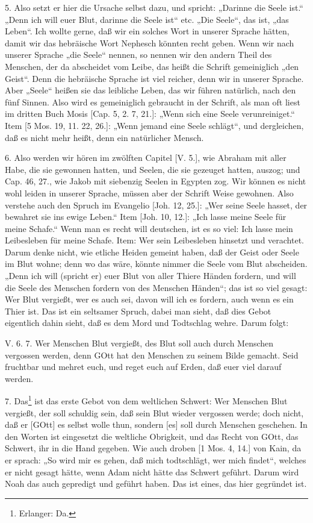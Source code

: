 5. Also setzt er hier die Ursache selbst dazu, und spricht: „Darinne die Seele ist.“ „Denn ich will euer Blut, darinne die Seele ist“ etc. „Die Seele“, das ist, „das Leben“. Ich wollte gerne, daß wir ein solches Wort in unserer Sprache hätten, damit wir das hebräische Wort Nephesch könnten recht geben. Wenn wir nach unserer Sprache „die Seele“ nennen, so nennen wir den andern Theil des Menschen, der da abscheidet vom Leibe, das heißt die Schrift gemeiniglich „den Geist“. Denn die hebräische Sprache ist viel reicher, denn wir in unserer Sprache. Aber „Seele“ heißen sie das leibliche Leben, das wir führen natürlich, nach den fünf Sinnen. Also wird es gemeiniglich gebraucht in der Schrift, als man oft liest im dritten Buch Mosis [Cap. 5, 2. 7, 21.]: „Wenn sich eine Seele verunreiniget.“ Item [5 Mos. 19, 11. 22, 26.]: „Wenn jemand eine Seele schlägt“, und dergleichen, daß es nicht mehr heißt, denn ein natürlicher Mensch.

6. Also werden wir hören im zwölften Capitel [V. 5.], wie Abraham mit aller Habe, die sie gewonnen hatten, und Seelen, die sie gezeuget hatten, auszog; und Cap. 46, 27., wie Jakob mit siebenzig Seelen in Egypten zog. Wir können es nicht wohl leiden in unserer Sprache, müssen aber der Schrift Weise gewohnen. Also verstehe auch den Spruch im Evangelio [Joh. 12, 25.]: „Wer seine Seele hasset, der bewahret sie ins ewige Leben.“ Item [Joh. 10, 12.]: „Ich lasse meine Seele für meine Schafe.“ Wenn man es recht will deutschen, ist es so viel: Ich lasse mein Leibesleben für meine Schafe. Item: Wer sein Leibesleben hinsetzt und verachtet. Darum denke nicht, wie etliche Heiden gemeint haben, daß der Geist oder Seele im Blut wohne; denn wo das wäre, könnte nimmer die Seele vom Blut abscheiden. „Denn ich will (spricht er) euer Blut von aller Thiere Händen fordern, und will die Seele des Menschen fordern von des Menschen Händen“; das ist so viel gesagt: Wer Blut vergießt, wer es auch sei, davon will ich es fordern, auch wenn es ein Thier ist. Das ist ein seltsamer Spruch, dabei man sieht, daß dies Gebot eigentlich dahin sieht, daß es dem Mord und Todtschlag wehre. Darum folgt:

\begin{schriftzitat}
V. 6. 7. Wer Menschen Blut vergießt, des Blut soll auch durch Menschen vergossen werden, denn GOtt hat den Menschen zu seinem Bilde gemacht. Seid fruchtbar und mehret euch, und reget euch auf Erden, daß euer viel darauf werden.
\end{schriftzitat}

7. Das\footnote{Erlanger: Da.} ist das erste Gebot von dem weltlichen Schwert: Wer Menschen Blut vergießt, der soll schuldig sein, daß sein Blut wieder vergossen werde; doch nicht, daß er [GOtt] es selbst wolle thun, sondern [es] soll durch Menschen geschehen. In den Worten ist eingesetzt die weltliche Obrigkeit, und das Recht von GOtt, das Schwert, ihr in die Hand gegeben. Wie auch droben [1 Mos. 4, 14.] von Kain, da er sprach: „So wird mir es gehen, daß mich todtschlägt, wer mich findet“, welches er nicht gesagt hätte, wenn Adam nicht hätte das Schwert geführt. Darum wird Noah das auch gepredigt und geführt haben. Das ist eines, das hier gegründet ist.

